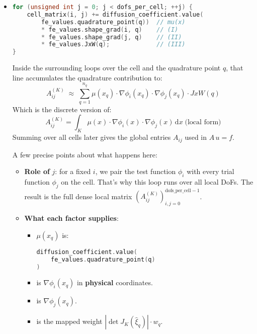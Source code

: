 \begin{itemize}
    \item {}
    \begin{lstlisting}[language=C++]
for (unsigned int j = 0; j < dofs_per_cell; ++j) {
    cell_matrix(i, j) += diffusion_coefficient.value(
        fe_values.quadrature_point(q))  // mu(x)
        * fe_values.shape_grad(i, q)    // (I)
        * fe_values.shape_grad(j, q)    // (II)
        * fe_values.JxW(q);             // (III)
}\end{lstlisting}
    Inside the surrounding loops over the cell and the quadrature point $q$, that line accumulates the quadrature contribution to:
    \begin{equation*}
        A^{(K)}_{ij} \;\approx\; \displaystyle\sum_{q=1}^{n_{q}} \mu(x_q) \cdot \nabla\phi_{i}\left(x_{q}\right) \cdot \nabla\phi_{j}\left(x_{q}\right) \cdot JxW(q)
    \end{equation*}
    Which is the discrete version of:
    \begin{equation*}
        A^{(K)}_{ij} = \displaystyle\int_{K} \mu(x) \cdot \nabla\phi_i(x) \cdot \nabla\phi_j(x)\,\mathrm{d}x \; \text{(local form)}
    \end{equation*}
    Summing over all cells later gives the global entries $A_{ij}$ used in $A\, u = f$.

    A few precise points about what happens here:
    \begin{itemize}
        \item \textbf{Role of} $j$: for a fixed $i$, we pair the test function $\phi_i$ with every trial function $\phi_j$ on the cell. That's why this loop runs over all local DoFs. The result is the full dense local matrix $\left(A^{(K)}_{ij}\right)_{i,j=0}^{\text{dofs\_per\_cell}-1}$.
        
        \item \textbf{What each factor supplies}:
        \begin{itemize}
            \item $\mu(x_q)$ is:
            \begin{lstlisting}[language=C++]
diffusion_coefficient.value(
    fe_values.quadrature_point(q)
)\end{lstlisting}
            \item {} is $\nabla\phi_i(x_q)$ in \textbf{physical} coordinates.
            \item {} is $\nabla\phi_j(x_q)$.
            \item {} is the mapped weight $\left|\det J_K\left(\hat{\xi}_q\right)\right| \cdot w_q$.
        \end{itemize}


\end{itemize}
\end{itemize}
